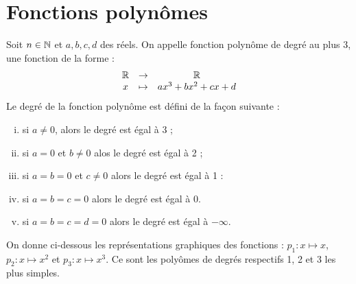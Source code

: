 \documentclass[a4paper, 12pt]{report}
\begin{document}
\section{Fonctions polynômes}

\begin{defn}
Soit $n \in \mathbb{N}$ et $a, b, c, d$ des réels. On appelle fonction polynôme de degré au plus 3, une fonction de la forme :
\[ \begin{array}{c c c}
\mathbb{R} & \to & \mathbb{R} \\
x & \mapsto & ax^3 + bx^2 +cx + d
\end{array} \]
Le degré de la fonction polynôme est défini de la façon suivante :
\begin{enumerate}[(i)]
\item si $a \neq 0$, alors le degré est égal à 3 ;
\item si $a = 0$ et $b \neq 0$ alos le degré est égal à 2 ;
\item si $a=b=0$ et $c \neq 0$ alors le degré est égal à 1 :
\item si $a=b=c=0$ alors le degré est égal à 0.
\item si $a=b=c=d=0$ alors le degré est égal à $-\infty$.
\end{enumerate}
\end{defn}

\begin{rmq}
On donne ci-dessous les représentations graphiques des fonctions : 
$p_1 : x \mapsto x$, $p_2 : x \mapsto x^2$ et $p_3 : x \mapsto x^3$.
Ce sont les polyômes de degrés respectifs 1, 2 et 3 les plus simples.
\begin{center}
\end{center}
\end{rmq}
\end{document}
